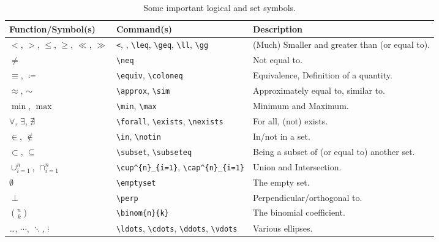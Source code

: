 \begin{table}[ht!]
\begin{tabularx}{\textwidth}{|p{}|>{\raggedright}p{}|X|}
\hline
Function/Symbol(s) & Command(s) & Description \\
\hline
$<$, $>$, $\leq$, $\geq$, $\ll$, $\gg$ & \texttt{<}, \text{>}, \texttt{\textbackslash leq}, \texttt{\textbackslash geq}, \texttt{\textbackslash ll}, \texttt{\textbackslash gg} & (Much) Smaller and greater than (or equal to). \\
\hline
$\neq$ & \texttt{\textbackslash neq} & Not equal to. \\
\hline
$\equiv$, $\coloneq$ & \texttt{\textbackslash equiv}, \texttt{\textbackslash coloneq} & Equivalence, Definition of a quantity. \\
\hline
$\approx$, $\sim$ & \texttt{\textbackslash approx}, \texttt{\textbackslash sim} & Approximately equal to, similar to. \\
\hline
$\min$, $\max$ & \texttt{\textbackslash min}, \texttt{\textbackslash max} & Minimum and Maximum. \\
\hline
$\forall$, $\exists$, $\nexists$ & \texttt{\textbackslash forall}, \texttt{\textbackslash exists}, \texttt{\textbackslash nexists} & For all, (not) exists. \\
\hline
$\in$, $\notin$ & \texttt{\textbackslash in}, \texttt{\textbackslash notin} & In/not in a set. \\
\hline 
$\subset$, $\subseteq$ & \texttt{\textbackslash subset}, \texttt{\textbackslash subseteq} & Being a subset of (or equal to) another set.\\
\hline
$\cup^{n}_{i=1}$, $\cap^{n}_{i=1}$ & \texttt{\textbackslash cup\^{}\{n\}\_\{i=1\}}, \texttt{\textbackslash cap\^{}\{n\}\_\{i=1\}} & Union and Intersection. \\
\hline
$\emptyset$ & \texttt{\textbackslash emptyset} & The empty set. \\
\hline
$\perp$ & \texttt{\textbackslash perp} & Perpendicular/orthogonal to. \\
\hline
$\binom{n}{k}$ & \texttt{\textbackslash binom\{n\}\{k\}} & The binomial coefficient. \\
\hline
\ldots, $\cdots$, $\ddots$, $\vdots$ & \texttt{\textbackslash ldots}, \texttt{\textbackslash cdots}, \texttt{\textbackslash ddots}, \texttt{\textbackslash vdots} & Various ellipses. \\
\hline
\end{tabularx}
\caption{Some important logical and set symbols.}
\label{tab:logicsetsymbol}
\end{table}

